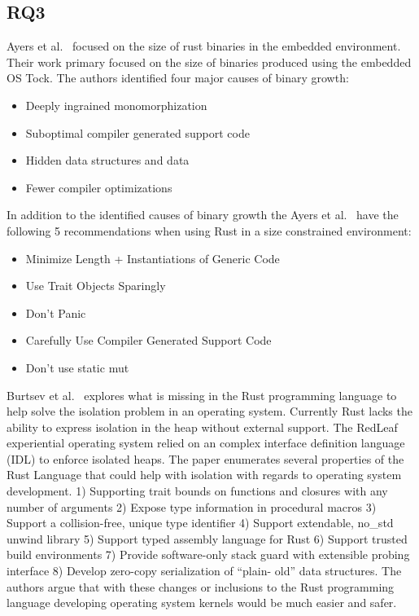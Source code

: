 \documentclass[sigconf]{acmart}
\begin{document}
\subsection{RQ3}

Ayers et al.~\cite{Ayers2022-sf} focused on the size of rust binaries in the embedded
environment. Their work primary focused on the size of binaries produced using the embedded OS
Tock. The authors identified four major causes of binary growth:

\begin{itemize}

\item Deeply ingrained monomorphization
\item Suboptimal compiler generated support code
\item Hidden data structures and data
\item Fewer compiler optimizations
\end{itemize}

In addition to the identified causes of binary growth the Ayers et al.~\cite{Ayers2022-sf} have the
following 5 recommendations when using Rust in a size constrained environment:
\begin{itemize}
  \item Minimize Length + Instantiations of Generic Code
  \item Use Trait Objects Sparingly
  \item Don't Panic
  \item Carefully Use Compiler Generated Support Code
  \item Don't use static mut
\end{itemize}

Burtsev et al.~\cite{Burtsev2021-mh} explores what is missing in the Rust programming language to
help solve the isolation problem in an operating system. Currently Rust lacks the ability to express
isolation in the heap without external support. The RedLeaf experiential operating system relied on
an complex interface definition language (IDL) to enforce isolated heaps. The paper enumerates
several properties of the Rust Language that could help with isolation with regards to operating
system development. 1) Supporting trait bounds on functions and closures with any number of
arguments 2) Expose type information in procedural macros 3) Support a collision-free, unique type
identifier 4) Support extendable, no\_std unwind library 5) Support typed assembly language for Rust
6) Support trusted build environments 7) Provide software-only stack guard with extensible probing
interface 8) Develop zero-copy serialization of “plain- old” data structures. The authors argue that
with these changes or inclusions to the Rust programming language developing operating system
kernels would be much easier and safer.
\end{document}

